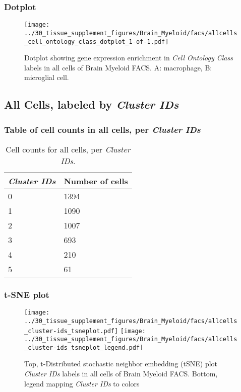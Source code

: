 \clearpage

\subsubsection{Dotplot}
\begin{figure}[h]
\centering
\texttt{[image: ../30\_tissue\_supplement\_figures/Brain\_Myeloid/facs/allcells\_cell\_ontology\_class\_dotplot\_1-of-1.pdf]}

\caption{ Dotplot  showing gene expression enrichment in \emph{Cell Ontology Class} labels in all cells of Brain Myeloid FACS. A: macrophage, B: microglial cell.}
\end{figure}


\clearpage

\subsection{All Cells, labeled by \emph{Cluster IDs}}
\subsubsection{Table of cell counts in all cells, per \emph{Cluster IDs}}\begin{table}[h]
\centering
\label{my-label}
\begin{tabular}{@{}ll@{}}
\toprule

\emph{Cluster IDs}& Number of cells \\ \midrule
0 & 1394 \\

1 & 1090 \\

2 & 1007 \\

3 & 693 \\

4 & 210 \\

5 & 61 \\
\bottomrule
\end{tabular}
\caption{Cell counts for all cells, per \emph{Cluster IDs}.}
\end{table}

\clearpage
\subsubsection{t-SNE plot}
\begin{figure}[h]
\centering
\texttt{[image: ../30\_tissue\_supplement\_figures/Brain\_Myeloid/facs/allcells\_cluster-ids\_tsneplot.pdf]}
\texttt{[image: ../30\_tissue\_supplement\_figures/Brain\_Myeloid/facs/allcells\_cluster-ids\_tsneplot\_legend.pdf]}
\caption{Top, t-Distributed stochastic neighbor embedding (tSNE) plot  \emph{Cluster IDs} labels in all cells of Brain Myeloid FACS. Bottom, legend mapping \emph{Cluster IDs} to colors}
\end{figure}


